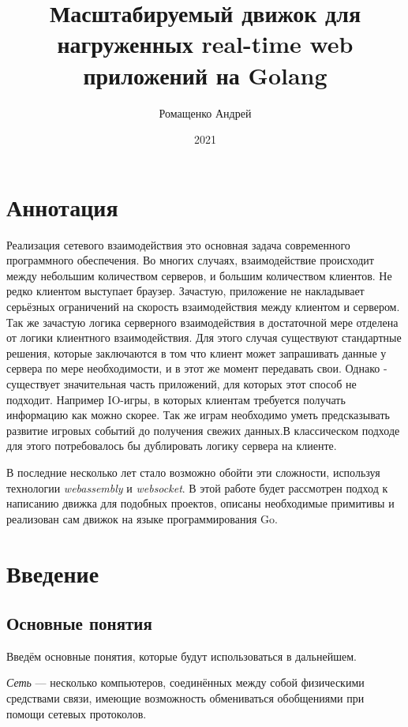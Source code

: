 \documentclass[a4paper,14pt, openany]{book}
\title{Масштабируемый движок для нагруженных real-time web приложений на Golang}
\author{Ромащенко Андрей}
\date{2021}
\begin{document}
\maketitle

\chapter*{Аннотация}

Реализация сетевого взаимодействия это основная задача современного программного обеспечения. Во многих случаях, взаимодействие происходит между небольшим количеством серверов, и большим количеством клиентов. Не редко клиентом выступает браузер. Зачастую, приложение не накладывает серьёзных ограничений на скорость взаимодействия между клиентом и сервером. Так же зачастую логика серверного взаимодействия в достаточной мере отделена от логики клиентного взаимодействия. Для этого случая существуют стандартные решения, которые заключаются в том что клиент может запрашивать данные у сервера по мере необходимости, и в этот же момент передавать свои. Однако - существует значительная часть приложений, для которых этот способ не подходит. Например IO-игры, в которых клиентам требуется получать информацию как можно скорее. Так же играм необходимо уметь предсказывать развитие игровых событий до получения свежих данных.В классическом подходе для этого потребовалось бы дублировать логику сервера на клиенте.

В последние несколько лет стало возможно обойти эти сложности, используя технологии \textit{webassembly}  и \textit{websocket}. В этой работе будет рассмотрен подход к написанию движка для подобных проектов, описаны необходимые примитивы и реализован сам движок на языке программирования Go.
\par
\setcounter{page}{2}
\tableofcontents
\clearpage



\chapter{Введение}

\section{Основные понятия}

Введём основные понятия, которые будут использоваться в дальнейшем.

\emph{Сеть} --- несколько компьютеров, соединённых между собой физическими средствами связи, имеющие возможность обмениваться обобщениями при помощи сетевых протоколов.
\end{document}
